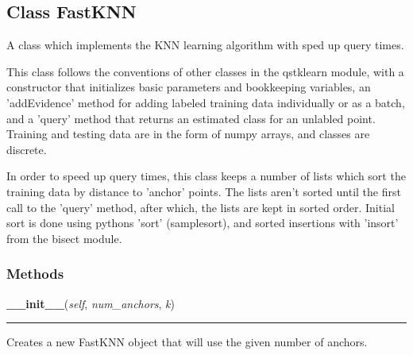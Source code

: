 \subsection{Class FastKNN}

    \label{QSTK:qstklearn:fastknn:FastKNN}
A class which implements the KNN learning algorithm with sped up query 
times.

This class follows the conventions of other classes in the qstklearn 
module, with a constructor that initializes basic parameters and 
bookkeeping variables, an 'addEvidence' method for adding labeled training 
data individually or as a batch, and a 'query' method that returns an 
estimated class for an unlabled point.  Training and testing data are in 
the form of numpy arrays, and classes are discrete.

In order to speed up query times, this class keeps a number of lists which 
sort the training data by distance to 'anchor' points.  The lists aren't 
sorted until the first call to the 'query' method, after which, the lists 
are kept in sorted order. Initial sort is done using pythons 'sort' 
(samplesort), and sorted insertions with 'insort' from the bisect module.



  \subsubsection{Methods}

    \label{QSTK:qstklearn:fastknn:FastKNN:__init__}

    \vspace{0.5ex}

\hspace{.8\funcindent}\begin{boxedminipage}{\funcwidth}

    \raggedright \textbf{\_\_init\_\_}(\textit{self}, \textit{num\_anchors}, \textit{k})

    \vspace{-1.5ex}

    \rule{\textwidth}{0.5\fboxrule}
\setlength{\parskip}{2ex}
    Creates a new FastKNN object that will use the given number of anchors.

\setlength{\parskip}{1ex}
    \end{boxedminipage}

